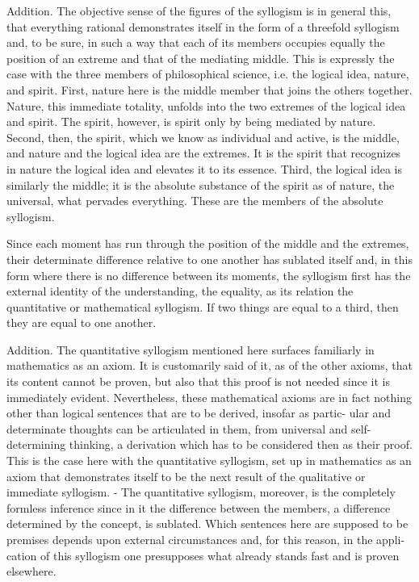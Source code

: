 Addition. The objective sense of the figures of the syllogism is in general this,
that everything rational demonstrates itself in the form of a threefold syllogism
and, to be sure, in such a way that each of its members occupies equally the
position of an extreme and that of the mediating middle. This is expressly the
case with the three members of philosophical science, i.e. the logical idea, nature,
and spirit. First, nature here is the middle member that joins the others together.
Nature, this immediate totality, unfolds into the two extremes of the logical idea
and spirit. The spirit, however, is spirit only by being mediated by nature. Second,
then, the spirit, which we know as individual and active, is the middle,
and nature and the logical idea are the extremes. It is the spirit that recognizes
in nature the logical idea and elevates it to its essence. Third, the logical idea
is similarly the middle; it is the absolute substance of the spirit as of nature,
the universal, what pervades everything. These are the members of the absolute
syllogism.

Since each moment has run through the position of the middle and the
extremes, their determinate difference relative to one another has sublated
itself and, in this form where there is no difference between its moments, the
syllogism first has the external identity of the understanding, the equality,
as its relation the quantitative or mathematical syllogism. If
two things are equal to a third, then they are equal to one another.

Addition. The quantitative syllogism mentioned here surfaces familiarly in
mathematics as an axiom. It is customarily said of it, as of the other axioms,
that its content cannot be proven, but also that this proof is not needed since
it is immediately evident. Nevertheless, these mathematical axioms are in fact
nothing other than logical sentences that are to be derived, insofar as partic-
ular and determinate thoughts can be articulated in them, from universal and
self-determining thinking, a derivation which has to be considered then as their
proof. This is the case here with the quantitative syllogism, set up in mathematics
as an axiom that demonstrates itself to be the next result of the qualitative or
immediate syllogism. - The quantitative syllogism, moreover, is the completely
formless inference since in it the difference between the members, a difference
determined by the concept, is sublated. Which sentences here are supposed to be
premises depends upon external circumstances and, for this reason, in the appli-
cation of this syllogism one presupposes what already stands fast and is proven
elsewhere.

